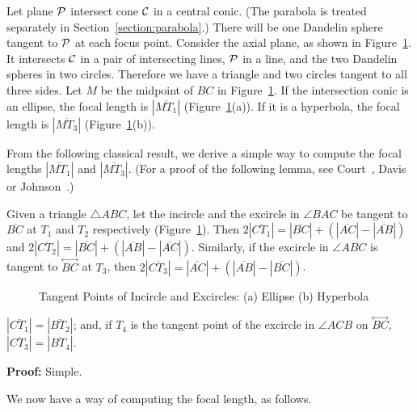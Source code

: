 Let plane ${\cal P}$ intersect cone ${\cal C}$ in a central conic.  
(The parabola is treated separately in Section~\ref{section:parabola}.)
There will be one Dandelin sphere tangent to ${\cal P}$ at each focus point.  
Consider the axial plane, as shown in Figure~\ref{fig:tangent-points}.
It intersects ${\cal C}$ in a pair of intersecting lines, ${\cal P}$ in a 
line, and the two Dandelin spheres in two circles.  
Therefore we have a triangle and two circles tangent to all three sides.
Let $M$ be the midpoint of $BC$ in Figure~\ref{fig:tangent-points}.
If the intersection conic is an ellipse, 
the focal length is $|\overline{MT_1}|$ (Figure~\ref{fig:tangent-points}(a)).
If it is a hyperbola, 
the focal length is $|\overline{MT_3}|$ (Figure~\ref{fig:tangent-points}(b)).

From the following classical result, we derive a simple way to compute
the focal lengths $|\overline{MT_1}|$ and $|\overline{MT_3}|$.
(For a proof of the following lemma, 
see Court~\cite{court:1925},  Davis~\cite{davis:1949} or
Johnson~\cite{johnson:1929}.)

\begin{lemma}
\label{lemma:tangent-points}
     Given a triangle $\bigtriangleup ABC$, let the incircle and the excircle
in $\angle BAC$ be tangent to $\overline{BC}$ at $T_1$ and $T_2$ respectively
(Figure~\ref{fig:tangent-points}).  Then 
$2|\overline{CT_1}|=|\overline{BC}|+(|\overline{AC}|-|\overline{AB}|)$ and
$2|\overline{CT_2}|=|\overline{BC}|+(|\overline{AB}|-|\overline{AC}|)$.  
Similarly, if the excircle in $\angle ABC$ is tangent to 
$\stackrel{\longleftrightarrow}{BC}$ at $T_3$, then
$2|\overline{CT_3}|=|\overline{AC}|+(|\overline{AB}|-|\overline{BC}|)$.
\end{lemma}
\begin{figure}
\vspace{6cm}
\caption{Tangent Points of Incircle and Excircles: (a) Ellipse (b) Hyperbola}
\label{fig:tangent-points}
\end{figure}


\begin{corollary}
$|\overline{CT_1}|=|\overline{BT_2}|$; and, if $T_4$ is the tangent point of
the excircle in $\angle ACB$ on $\stackrel{\longleftrightarrow}{BC}$,
$|\overline{CT_3}|=|\overline{BT_4}|$.
\end{corollary}
{\bf Proof:} Simple. \QED

\noindent We now have a way of computing the focal length, as follows.

